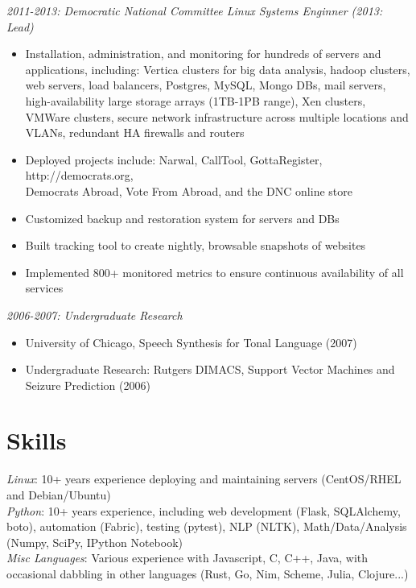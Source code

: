 \documentclass[line]{res} %
\begin{document}
\begin{resume}
    {\sl 2011-2013: Democratic National Committee Linux Systems Enginner (2013: Lead)}
        \begin{itemize}
            \item Installation, administration, and monitoring for hundreds of servers and applications, including: Vertica clusters for big data analysis, hadoop clusters, web servers, load balancers, Postgres, MySQL, Mongo DBs, mail servers, high-availability large storage arrays (1TB-1PB range), Xen clusters, VMWare clusters, secure network infrastructure across multiple locations and VLANs, redundant HA firewalls and routers
            \item Deployed projects include: Narwal, CallTool, GottaRegister, http://democrats.org, \\Democrats Abroad, Vote From Abroad, and the DNC online store
            \item Customized backup and restoration system for servers and DBs
            \item Built tracking tool to create nightly, browsable snapshots of websites
            \item Implemented 800+ monitored metrics to ensure continuous availability of all services
        \end{itemize}

{\sl 2006-2007: Undergraduate Research}
    \begin{itemize} 
        \item University of Chicago, Speech Synthesis for Tonal Language (2007)
        \item Undergraduate Research: Rutgers DIMACS, Support Vector Machines and Seizure Prediction (2006)
    \end{itemize}

\section{Skills}
{\sl Linux}: 10+ years experience deploying and maintaining servers (CentOS/RHEL and Debian/Ubuntu)\\
{\sl Python}: 10+ years experience, including web development (Flask, SQLAlchemy, boto), automation (Fabric), testing (pytest), NLP (NLTK), Math/Data/Analysis (Numpy, SciPy, IPython Notebook) \\
{\sl Misc Languages}: Various experience with Javascript, C, C++, Java, with occasional dabbling in other languages (Rust, Go, Nim, Scheme, Julia, Clojure...)



\end{resume}
\end{document}
